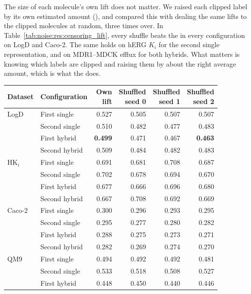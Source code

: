 The size of each molecule's own lift does not matter. We raised each clipped label by its own estimated amount (), and compared this with dealing the same lifts to the clipped molecules at random, three times over. In Table~\ref{tab:noise:res:censoring_lift}, every shuffle beats the  in every configuration on LogD and Caco-2. The same holds on hERG $K_i$ for the second single representation, and on MDR1--MDCK efflux for both hybrids. What matters is knowing which labels are clipped and raising them by about the right average amount, which is what the  does.

\begin{table}[htbp]
\centering
\begin{tabular}{@{}llrrrr@{}}
\toprule
Dataset & Configuration & \makecell[r]{Own\\lift} & \makecell[r]{Shuffled\\seed 0} & \makecell[r]{Shuffled\\seed 1} & \makecell[r]{Shuffled\\seed 2} \\
\midrule
LogD & First single & 0.527 & 0.505 & 0.507 & 0.507 \\
 & Second single & 0.510 & 0.482 & 0.477 & 0.483 \\
 & First hybrid & \textbf{0.499} & 0.471 & 0.467 & \textbf{0.463} \\
 & Second hybrid & 0.509 & 0.484 & 0.482 & 0.483 \\
HK$_i$ & First single & 0.691 & 0.681 & 0.708 & 0.687 \\
 & Second single & 0.702 & 0.678 & 0.694 & 0.670 \\
 & First hybrid & 0.677 & 0.666 & 0.696 & 0.680 \\
 & Second hybrid & 0.667 & 0.708 & 0.692 & 0.669 \\
Caco-2 & First single & 0.300 & 0.296 & 0.293 & 0.295 \\
 & Second single & 0.295 & 0.277 & 0.280 & 0.282 \\
 & First hybrid & 0.288 & 0.275 & 0.273 & 0.271 \\
 & Second hybrid & 0.282 & 0.269 & 0.274 & 0.270 \\
QM9 & First single & 0.494 & 0.492 & 0.492 & 0.481 \\
 & Second single & 0.533 & 0.518 & 0.508 & 0.527 \\
 & First hybrid & 0.448 & 0.450 & 0.440 & 0.446 \\

\end{tabular}
\end{table}
